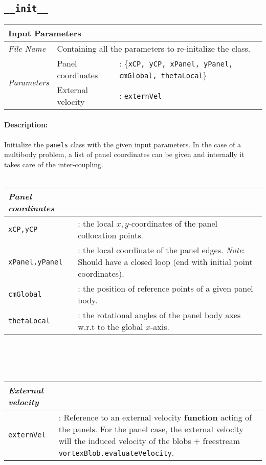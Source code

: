 \subsection{\texttt{\_\_init\_\_}}
	\begin{tabular}{l|lp{7cm}}
		\multicolumn{2}{l}{\textbf{Input Parameters}} & \\ \hline
		\textit{File Name} & \multicolumn{2}{l}{Containing all the parameters to re-initalize the class.} \\ \hline
		\multirow{2}{*}{\textit{Parameters}} & Panel coordinates &: \{\texttt{xCP, yCP, xPanel, yPanel, cmGlobal, thetaLocal}\}\\ \cline{2-3}
		& External velocity &: \texttt{externVel} \\ \cline{2-3}
	\end{tabular}
	\paragraph{Description:} Initialize the \texttt{panels} class with the given input parameters. In the case of a multibody problem, a list of panel coordinates can be given and internally it takes care of the inter-coupling.\\
	\\
	\begin{tabular}{lp{10cm}}
				\textit{Panel coordinates} & \\ \hline
				\texttt{xCP,yCP} &:  the local $x,y$-coordinates of the panel collocation points.\\ 
				\texttt{xPanel,yPanel} &: the local coordinate of the panel edges. \textit{Note}: Should have a closed loop (end with initial point coordinates).\\ 
				\texttt{cmGlobal} &:  the position of reference points of a given panel body.\\
				\texttt{thetaLocal} &:  the rotational angles of the panel body axes w.r.t to the global $x$-axis.\\
	\end{tabular}\\ 
    \\ \\
	\begin{tabular}{lp{10cm}}
				\textit{External velocity} & \\ \hline
				\texttt{externVel} &:  Reference to an external velocity \textbf{function} acting of the panels. For the panel case, the external velocity will the induced velocity of the blobs + freestream \texttt{vortexBlob.evaluateVelocity}.\\
	\end{tabular}\\
	
